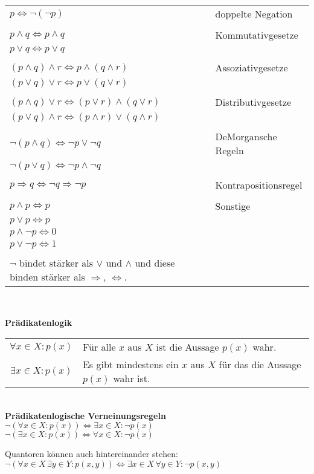 \documentclass[a4paper]{article}
\begin{document}
\begin{tabular}{l l}
$  p \Leftrightarrow \lnot (\lnot p) $   &   doppelte Negation \\
\\
$p \land q \Leftrightarrow p \land q$ &  Kommutativgesetze\\
$p \lor q  \Leftrightarrow p \lor q$ \\
\\
$(p \land q) \land r \Leftrightarrow p \land (q \land r)$ & Assoziativgesetze \\
$(p \lor q) \lor r \Leftrightarrow p \lor (q \lor r)$ \\
\\
$(p \land q) \lor r\Leftrightarrow (p \lor r) \land (q \lor r)$  & Distributivgesetze \\
$(p \lor q) \land r \Leftrightarrow (p \land r) \lor (q \land r)$ \\
\\
$\lnot(p \land q) \Leftrightarrow \lnot p \lor \lnot q$ & DeMorgansche Regeln \\
$\lnot(p \lor q) \Leftrightarrow \lnot p \land \lnot q$  \\
\\
$p \Rightarrow q \Leftrightarrow \lnot q \Rightarrow \lnot p$ & Kontrapositionsregel \\
\\
$p \land p  \Leftrightarrow p $ & Sonstige \\
$p \lor p  \Leftrightarrow p $  \\
$p \land \lnot p  \Leftrightarrow 0 $ \\
$p \lor \lnot p  \Leftrightarrow 1 $ \\
\\
$\lnot$ bindet stärker als $\lor$ und $\land$ und diese binden stärker als $\Rightarrow$, $\Leftrightarrow$. 
\end{tabular} \\
\bigskip

\textbf{Prädikatenlogik}
\bigskip

\begin{tabular}{c l}

$\forall x \in X: p(x)$ & Für alle $x$ aus $X$ ist die Aussage $p(x)$ wahr. \\
$\exists x \in X: p(x)$ & Es gibt mindestens ein $x$ aus $X$ für das die Aussage $p(x)$ wahr ist.\\
\end{tabular} \\

\bigskip
\textbf{Prädikatenlogische Verneinungsregeln} \\

$\lnot (\forall x \in X: p(x)) \Leftrightarrow \exists x \in X : \lnot p(x)$   \\
$\lnot (\exists x \in X : p(x)) \Leftrightarrow \forall x \in X: \lnot p(x)$  
\bigskip

Quantoren können auch hintereinander stehen: \\
$\lnot (\forall x \in X \, \exists y \in Y: p(x,y)) \Leftrightarrow \exists x \in X \, \forall y \in Y: \lnot p(x,y)$
\end{document}
